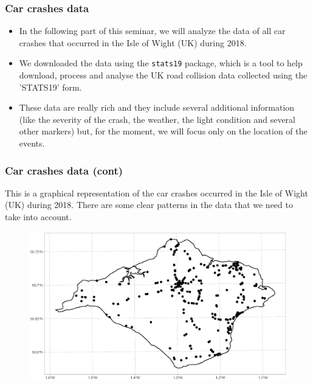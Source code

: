 \documentclass[c,10pt,pdftex]{beamer}
\begin{document}
\begin{frame}
\frametitle{Car crashes data}
\vspace{-0.75cm}
\begin{itemize}
	\setlength\itemsep{1em}
	\item In the following part of this seminar, we will analyze the data of all car crashes that occurred in the \alert{Isle of Wight (UK) during 2018}. 
	
	\item We downloaded the data using the \texttt{stats19} package, which is a tool to help download, process and analyse the UK road collision data collected using the 'STATS19' form. 
	
	\item These data are really rich and they include several additional information (like the severity of the crash, the weather, the light condition and several other markers) but, for the moment, we will focus only on the location of the events. 
\end{itemize}
\end{frame}

\begin{frame}
\frametitle{Car crashes data (cont)}
\vspace{-0.25cm}
This is a graphical representation of the car crashes occurred in the Isle of Wight (UK) during 2018. There are some clear patterns in the data that we need to take into account.
\begin{figure}
	\centering
	\includegraphics[width=\linewidth]{images/iow_crashes}
\end{figure}
\end{frame}
\end{document}
